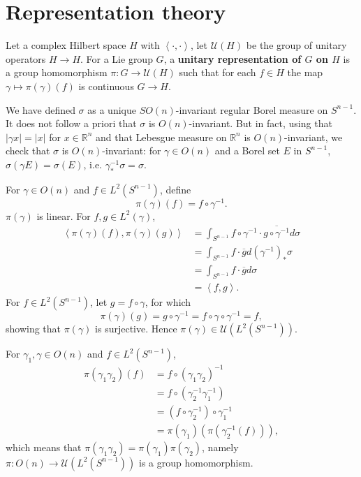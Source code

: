 \documentclass{article}
\newcommand{\inner}[2]{\left\langle #1, #2 \right\rangle}
\theoremstyle{definition}
\begin{document}
\section{Representation theory}
Let a complex Hilbert space $H$ with $\inner{\cdot}{\cdot}$, let $\mathscr{U}(H)$ be the group of
unitary operators $H \to H$. 
For a Lie group $G$, 
a \textbf{unitary representation of $G$ on $H$} is a 
group homomorphism $\pi:G \to \mathscr{U}(H)$ such that for each $f \in H$ the map
$\gamma \mapsto \pi(\gamma)(f)$ is continuous $G \to H$. 


We have defined $\sigma$ as a unique $SO(n)$-invariant regular Borel measure on $S^{n-1}$.
It does not follow a priori that $\sigma$ is $O(n)$-invariant. But in fact, using that
$|\gamma x|=|x|$ for $x \in \mathbb{R}^n$ and that Lebesgue measure on $\mathbb{R}^n$ is $O(n)$-invariant,
we check that
 $\sigma$ is $O(n)$-invariant:
for $\gamma \in O(n)$ and a Borel set $E$ in $S^{n-1}$, 
$\sigma(\gamma E)=\sigma(E)$, i.e. ${\gamma}^{-1}_* \sigma = \sigma$. 

For $\gamma \in O(n)$ and $f \in L^2(S^{n-1})$, define
\[
\pi(\gamma)(f) = f \circ \gamma^{-1}.
\]
$\pi(\gamma)$ is linear. For $f,g \in L^2(\gamma)$,
\begin{align*}
\inner{\pi(\gamma)(f)}{\pi(\gamma)(g)}&=\int_{S^{n-1}} f \circ \gamma^{-1} \cdot \overline{g \circ \gamma^{-1}} d\sigma\\
&=\int_{S^{n-1}} f \cdot \overline{g} d(\gamma^{-1})_* \sigma\\
&=\int_{S^{n-1}} f \cdot \overline{g} d\sigma\\
&=\inner{f}{g}.
\end{align*}
For $f \in L^2(S^{n-1})$, let $g = f \circ \gamma$, for which
\[
\pi(\gamma)(g) = g \circ \gamma^{-1} = f \circ \gamma \circ \gamma^{-1} = f,
\]
showing that $\pi(\gamma)$ is surjective. Hence $\pi(\gamma) \in \mathscr{U}(L^2(S^{n-1}))$.

For $\gamma_1,\gamma \in O(n)$ and $f \in L^2(S^{n-1})$,
\begin{align*}
\pi(\gamma_1 \gamma_2)(f) &= f \circ (\gamma_1 \gamma_2)^{-1}\\
&=f \circ (\gamma_2^{-1} \gamma_1^{-1})\\
&=(f \circ \gamma_2^{-1}) \circ \gamma_1^{-1}\\
&=\pi(\gamma_1)(\pi(\gamma_2^{-1}(f))),
\end{align*}
which means that $\pi(\gamma_1 \gamma_2) = \pi(\gamma_1)  \pi(\gamma_2)$, namely
$\pi:O(n) \to \mathscr{U}(L^2(S^{n-1}))$ is a group homomorphism. 
\end{document}

